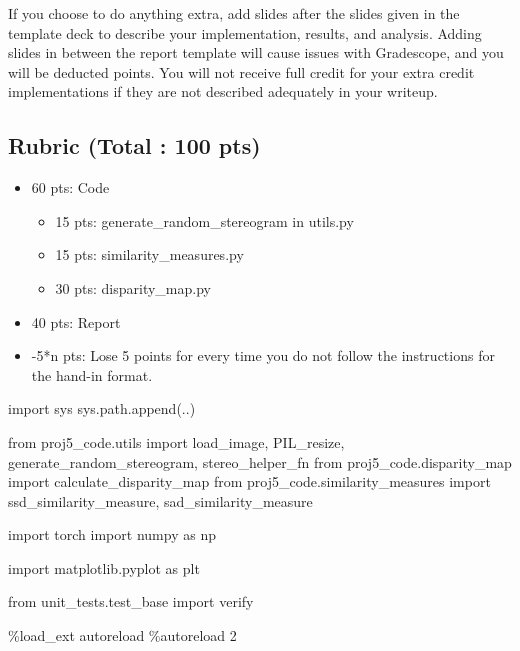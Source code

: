 \documentclass[
  letterpaper,
  DIV=11,
  numbers=noendperiod]{scrartcl}
\newenvironment{Shaded}{\begin{snugshade}}{\end{snugshade}}
\newcommand{\DecValTok}[1]{\textcolor[rgb]{0.68,0.00,0.00}{#1}}
\newcommand{\ImportTok}[1]{\textcolor[rgb]{0.00,0.46,0.62}{#1}}
\newcommand{\NormalTok}[1]{\textcolor[rgb]{0.00,0.23,0.31}{#1}}
\newcommand{\OperatorTok}[1]{\textcolor[rgb]{0.37,0.37,0.37}{#1}}
\newcommand{\StringTok}[1]{\textcolor[rgb]{0.13,0.47,0.30}{#1}}
\providecommand{\tightlist}{%
  \setlength{\itemsep}{0pt}\setlength{\parskip}{0pt}}\usepackage{longtable,booktabs,array}
\begin{document}
If you choose to do anything extra, add slides after the slides given in
the template deck to describe your implementation, results, and
analysis. Adding slides in between the report template will cause issues
with Gradescope, and you will be deducted points. You will not receive
full credit for your extra credit implementations if they are not
described adequately in your writeup.

\hypertarget{rubric-total-100-pts}{%
\subsection{Rubric (Total : 100 pts)}\label{rubric-total-100-pts}}

\begin{itemize}
\tightlist
\item
  60 pts: Code

  \begin{itemize}
  \tightlist
  \item
    15 pts: generate\_random\_stereogram in utils.py
  \item
    15 pts: similarity\_measures.py
  \item
    30 pts: disparity\_map.py
  \end{itemize}
\item
  40 pts: Report
\item
  -5*n pts: Lose 5 points for every time you do not follow the
  instructions for the hand-in format.
\end{itemize}

\begin{Shaded}
\begin{Highlighting}[]
\ImportTok{import}\NormalTok{ sys}
\NormalTok{sys.path.append(}\StringTok{\textquotesingle{}..\textquotesingle{}}\NormalTok{)}

\ImportTok{from}\NormalTok{ proj5\_code.utils }\ImportTok{import}\NormalTok{ load\_image, PIL\_resize, generate\_random\_stereogram, stereo\_helper\_fn}
\ImportTok{from}\NormalTok{ proj5\_code.disparity\_map }\ImportTok{import}\NormalTok{ calculate\_disparity\_map}
\ImportTok{from}\NormalTok{ proj5\_code.similarity\_measures }\ImportTok{import}\NormalTok{ ssd\_similarity\_measure, sad\_similarity\_measure}

\ImportTok{import}\NormalTok{ torch}
\ImportTok{import}\NormalTok{ numpy }\ImportTok{as}\NormalTok{ np}

\ImportTok{import}\NormalTok{ matplotlib.pyplot }\ImportTok{as}\NormalTok{ plt}

\ImportTok{from}\NormalTok{ unit\_tests.test\_base }\ImportTok{import}\NormalTok{ verify}

\OperatorTok{\%}\NormalTok{load\_ext autoreload}
\OperatorTok{\%}\NormalTok{autoreload }\DecValTok{2}
\end{Highlighting}
\end{Shaded}
\end{document}

